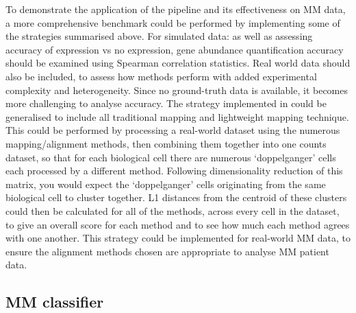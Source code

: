 To demonstrate the application of the pipeline and its effectiveness on MM data, a more comprehensive benchmark could be performed by implementing some of the strategies summarised above.
For simulated data: as well as assessing accuracy of expression vs no expression, gene abundance quantification accuracy should be examined using Spearman correlation statistics.
Real world data should also be included, to assess how methods perform with added experimental complexity and heterogeneity.
Since no ground-truth data is available, it becomes more challenging to analyse accuracy.
The strategy implemented in \cite{booeshaghi2021benchmarking} could be generalised to include all traditional mapping and lightweight mapping technique.
This could be performed by processing a real-world dataset using the numerous mapping/alignment methods, then combining them together into one counts dataset, so that for each biological cell there are numerous `doppelganger' cells each processed by a different method.
Following dimensionality reduction of this matrix, you would expect the `doppelganger' cells originating from the same biological cell to cluster together.
L1 distances from the centroid of these clusters could then be calculated for all of the methods, across every cell in the dataset, to give an overall score for each method and to see how much each method agrees with one another.
This strategy could be implemented for real-world MM data, to ensure the alignment methods chosen are appropriate to analyse MM patient data.

\subsection{MM classifier}




